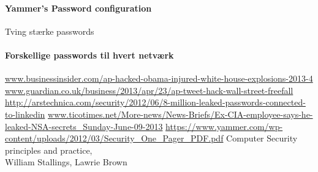 \documentclass{article}
\begin{document}
\paragraph{Yammer's Password configuration}
Tving stærke passwords

\paragraph{Forskellige passwords til hvert netværk}

\newpage
\begin{thebibliography}{100}


\url{www.businessinsider.com/ap-hacked-obama-injured-white-house-explosions-2013-4}
\url{www.guardian.co.uk/business/2013/apr/23/ap-tweet-hack-wall-street-freefall}
\url{http://arstechnica.com/security/2012/06/8-million-leaked-passwords-connected-to-linkedin}
\url{www.ticotimes.net/More-news/News-Briefs/Ex-CIA-employee-says-he-leaked-NSA-secrets_Sunday-June-09-2013}
\url{https://www.yammer.com/wp-content/uploads/2012/03/Security_One_Pager_PDF.pdf}
    Computer Security principles and practice,\\
    William Stallings, Lawrie Brown
\end{thebibliography}
\end{document}
